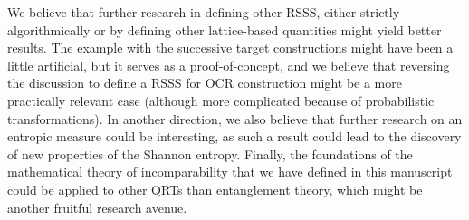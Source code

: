 We believe that further research in defining other RSSS, either strictly algorithmically or by defining other lattice-based quantities might yield better results. The example with the successive target constructions might have been a little artificial, but it serves as a proof-of-concept, and we believe that reversing the discussion to define a RSSS for OCR construction might be a more practically relevant case (although more complicated because of probabilistic transformations). In another direction, we also believe that further research on an entropic measure could be interesting, as such a result could lead to the discovery of new properties of the Shannon entropy. Finally, the foundations of the mathematical theory of incomparability that we have defined in this manuscript could be applied to other QRTs than entanglement theory, which might be another fruitful research avenue.